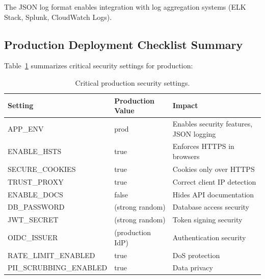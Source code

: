 The JSON log format enables integration with log aggregation systems (ELK Stack, Splunk, CloudWatch Logs).

\subsection{Production Deployment Checklist Summary}

Table~\ref{tab:prod-security-checklist} summarizes critical security settings for production:

\begin{table}[ht]
\centering
\caption{Critical production security settings.}
\label{tab:prod-security-checklist}
\small
\begin{tabular}{lll}
\hline
\textbf{Setting} & \textbf{Production Value} & \textbf{Impact} \\
\hline
APP\_ENV & prod & Enables security features, JSON logging \\
ENABLE\_HSTS & true & Enforces HTTPS in browsers \\
SECURE\_COOKIES & true & Cookies only over HTTPS \\
TRUST\_PROXY & true & Correct client IP detection \\
ENABLE\_DOCS & false & Hides API documentation \\
DB\_PASSWORD & (strong random) & Database access security \\
JWT\_SECRET & (strong random) & Token signing security \\
OIDC\_ISSUER & (production IdP) & Authentication security \\
RATE\_LIMIT\_ENABLED & true & DoS protection \\
PII\_SCRUBBING\_ENABLED & true & Data privacy \\
\hline
\end{tabular}
\end{table}

